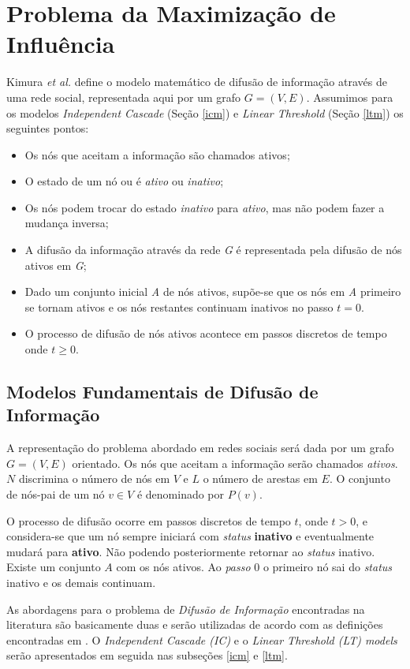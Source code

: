 \documentclass{acm_proc_article-sp}
\begin{document}
\section{Problema da Maximização de Influência}
Kimura \textit{et al.}\cite{kimura:2010} define o modelo matemático de difusão de informação através de uma rede 
social, representada aqui por um grafo $G = (V, E)$. Assumimos para os modelos \textit{Independent Cascade}
(Seção \ref{icm}) e \textit{Linear Threshold} (Seção \ref{ltm}) os seguintes pontos:
\begin{itemize}
  \item Os nós que aceitam a informação são chamados ativos;
  \item O estado de um nó ou é \textit{ativo} ou \textit{inativo};
  \item Os nós podem trocar do estado \textit{inativo} para \textit{ativo}, mas não podem fazer a mudança inversa;
  \item A difusão da informação através da rede \textit{G} é representada pela difusão de nós ativos em
  \textit{G};
  \item Dado um conjunto inicial \textit{A} de nós ativos, supõe-se que os nós em \textit{A} primeiro se tornam
  ativos e os nós restantes continuam inativos no passo $t = 0$.
  \item O processo de difusão de nós ativos acontece em passos discretos de tempo onde $t \geq 0$.
\end{itemize}

\subsection{Modelos Fundamentais de Difusão de Informação}
A representação do problema abordado em redes sociais será dada por um grafo $G = (V,E)$ orientado. Os nós que aceitam a informação 
serão chamados \textit{ativos}. $N$ discrimina o número de nós em $V$ e $L$ o número de arestas em $E$. O conjunto de
nós-pai de um nó $v \in V$ é denominado por $P(v)$.

O processo de difusão ocorre em passos discretos de tempo $t$, onde $t > 0$, e considera-se que um nó sempre iniciará com \textit{status}
\textbf{inativo} e eventualmente mudará para \textbf{ativo}. Não podendo posteriormente retornar ao \textit{status} inativo. Existe um 
conjunto $A$ com os nós ativos. Ao \textit{passo} $0$ o primeiro nó sai do \textit{status} inativo e os demais continuam.

As abordagens para o problema de \textit{Difusão de Informação} encontradas na literatura são basicamente duas e serão utilizadas de
acordo com as definições encontradas em \cite{kempe:2003}. O \textit{Independent Cascade (IC)} e o \textit{Linear Threshold (LT) models} 
serão apresentados em seguida nas subseções \ref{icm} e \ref{ltm}.
\end{document}
